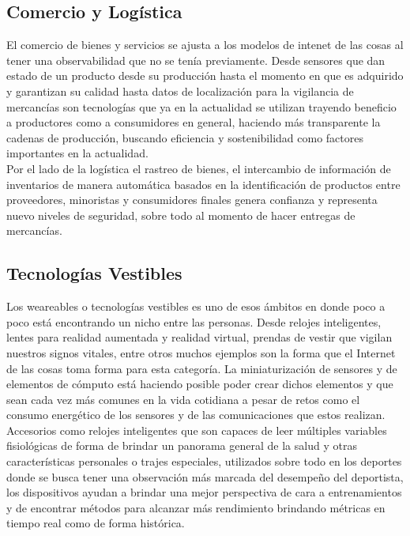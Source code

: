 \subsection{Comercio y Logística}
El comercio de bienes y servicios se ajusta a los modelos de intenet de las cosas al tener una observabilidad que no se tenía previamente. Desde sensores que dan estado de un producto desde su producción hasta el momento en que es adquirido y garantizan su calidad hasta datos de localización para la vigilancia de mercancías son tecnologías que ya en la actualidad se utilizan trayendo beneficio a productores como a consumidores en general, haciendo más transparente la cadenas de producción, buscando eficiencia  y sostenibilidad como factores importantes en la actualidad.\\

Por el lado de la logística el rastreo de bienes, el intercambio de información de inventarios de manera automática basados en la identificación de productos entre proveedores, minoristas y consumidores finales genera confianza y representa nuevo niveles de seguridad, sobre todo al momento de hacer entregas de mercancías.

\subsection{Tecnologías Vestibles}
Los weareables o tecnologías vestibles es uno de esos ámbitos en donde poco a poco está encontrando un nicho entre las personas. Desde relojes inteligentes, lentes para realidad aumentada y realidad virtual, prendas de vestir que vigilan nuestros signos vitales, entre otros muchos ejemplos son la forma que el Internet de las cosas toma forma para esta categoría. La miniaturización de sensores y de elementos de cómputo está haciendo posible poder crear dichos elementos y que sean cada vez más comunes en la vida cotidiana a pesar de retos como el consumo energético de los sensores y de las comunicaciones que estos realizan\cite{ibmappsiot}.\\

Accesorios como relojes inteligentes que son capaces de leer múltiples variables fisiológicas de forma de brindar un panorama general de la salud y otras características personales o trajes especiales, utilizados sobre todo en los deportes donde se busca tener una observación más marcada del desempeño del deportista, los dispositivos ayudan a brindar una mejor perspectiva de cara a entrenamientos y de encontrar métodos para alcanzar más rendimiento brindando métricas en tiempo real como de forma histórica.

